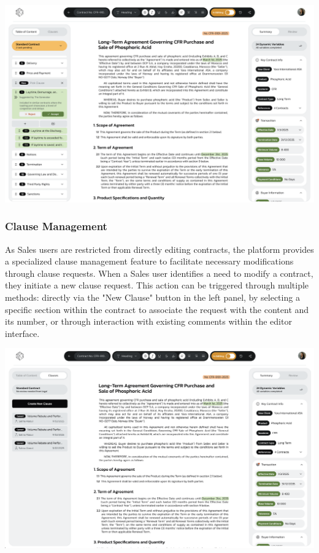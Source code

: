 \begin{center}
    \centering
    \includegraphics[width=1\textwidth]{Images/Article Suggested By Agent.png}
    \label{fig:article_suggested_by_agent}
\end{center}

\subsubsection{Clause Management}

As Sales users are restricted from directly editing contracts, the platform provides a specialized clause management feature to facilitate necessary modifications through clause requests. When a Sales user identifies a need to modify a contract, they initiate a new clause request. This action can be triggered through multiple methods: directly via the "New Clause" button in the left panel, by selecting a specific section within the contract to associate the request with the content and its number, or through interaction with existing comments within the editor interface.

\begin{center}
    \centering
    \includegraphics[width=1\textwidth]{Images/Clause Requests - Create New Clause.png}
    \label{fig:create_clause_request}
\end{center}

